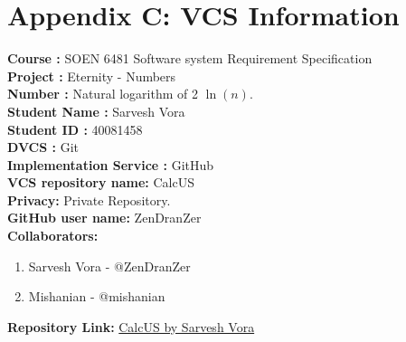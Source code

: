 \documentclass{article}
\begin{document}
\newpage
\section{Appendix C: VCS Information}
\textbf{Course : }SOEN 6481 Software system Requirement Specification \\
\textbf{Project :} Eternity - Numbers\\
\textbf{Number : } Natural logarithm of 2 $\ln(n)$.\\
\textbf{Student Name :} Sarvesh Vora\\
\textbf{Student ID : } 40081458 \\
\textbf{DVCS :} Git\\
\textbf{Implementation Service :} GitHub\\
\textbf{VCS repository name: }CalcUS\\
\textbf{Privacy: }Private Repository. \\
\textbf{GitHub user name: }ZenDranZer\\
\noindent
\textbf{Collaborators: }
\begin{enumerate}
    \item Sarvesh Vora - @ZenDranZer
    \item Mishanian - @mishanian
\end{enumerate}
\textbf{Repository Link: } \href{https://github.com/ZenDranZer/CalcUS}{CalcUS by Sarvesh Vora}
\end{document}
